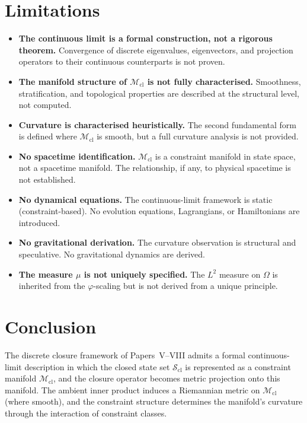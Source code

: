 \documentclass[12pt]{article}
\newcommand{\Mcl}{\mathcal{M}_{\mathrm{cl}}}
\newcommand{\Scl}{\mathcal{S}_{\mathrm{cl}}}
\newcommand{\phig}{\varphi}
\begin{document}
\section{Limitations}\label{sec:limits}

\begin{itemize}
    \item \textbf{The continuous limit is a formal construction, not a rigorous theorem.} Convergence of discrete eigenvalues, eigenvectors, and projection operators to their continuous counterparts is not proven.
    \item \textbf{The manifold structure of $\Mcl$ is not fully characterised.} Smoothness, stratification, and topological properties are described at the structural level, not computed.
    \item \textbf{Curvature is characterised heuristically.} The second fundamental form is defined where $\Mcl$ is smooth, but a full curvature analysis is not provided.
    \item \textbf{No spacetime identification.} $\Mcl$ is a constraint manifold in state space, not a spacetime manifold. The relationship, if any, to physical spacetime is not established.
    \item \textbf{No dynamical equations.} The continuous-limit framework is static (constraint-based). No evolution equations, Lagrangians, or Hamiltonians are introduced.
    \item \textbf{No gravitational derivation.} The curvature observation is structural and speculative. No gravitational dynamics are derived.
    \item \textbf{The measure $\mu$ is not uniquely specified.} The $L^2$ measure on $\Omega$ is inherited from the $\phig$-scaling but is not derived from a unique principle.
\end{itemize}

\section{Conclusion}\label{sec:conclusion}

The discrete closure framework of Papers~V--VIII admits a formal continuous-limit description in which the closed state set $\Scl$ is represented as a constraint manifold $\Mcl$, and the closure operator becomes metric projection onto this manifold. The ambient inner product induces a Riemannian metric on $\Mcl$ (where smooth), and the constraint structure determines the manifold's curvature through the interaction of constraint classes.
\end{document}
